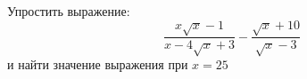 \begin{ex}
	\begin{condition}
		Упростить выражение:
		\[ \dfrac{x\sqrt{x}-1}{x-4\sqrt{x}+3}-\dfrac{\sqrt{x}+10}{\sqrt{x}-3} \]
		 и найти значение выражения при \( x=25 \)
	\end{condition}
\end{ex}